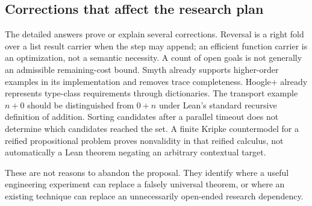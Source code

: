 \subsection{Corrections that affect the research plan}

The detailed answers prove or explain several corrections. Reversal is a right fold over a list result carrier when the step may append; an efficient function carrier is an optimization, not a semantic necessity. A count of open goals is not generally an admissible remaining-cost bound. Smyth already supports higher-order examples in its implementation and removes trace completeness. Hoogle+ already represents type-class requirements through dictionaries. The transport example $n+0$ should be distinguished from $0+n$ under Lean's standard recursive definition of addition. Sorting candidates after a parallel timeout does not determine which candidates reached the set. A finite Kripke countermodel for a reified propositional problem proves nonvalidity in that reified calculus, not automatically a Lean theorem negating an arbitrary contextual target.\cite{proposal,smyth,hoogle,leanmanual}

These are not reasons to abandon the proposal. They identify where a useful engineering experiment can replace a falsely universal theorem, or where an existing technique can replace an unnecessarily open-ended research dependency.
